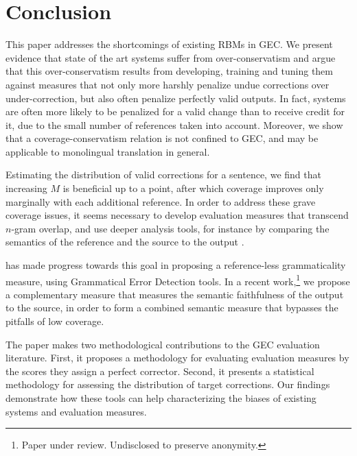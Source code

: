 \documentclass[a4paper, 11pt]{article}
\begin{document}
	\vspace{-0.1cm}
\section{Conclusion}\label{sec:conclusion}
	\vspace{-0.1cm}

This paper addresses the shortcomings of existing RBMs in GEC.
We present evidence that state of the art systems suffer from over-conservatism and
argue that this over-conservatism results from developing, training and tuning them against measures that
not only more harshly penalize undue corrections over under-correction,
but also often penalize perfectly valid outputs.
In fact, systems are often more likely to be penalized for a valid change than 
to receive credit for it, due to the small number of references taken into account.
Moreover, we show that a coverage-conservatism relation is not confined to
GEC, and may be applicable to monolingual translation in general.

Estimating the distribution of valid corrections for a sentence, we find
that increasing $M$ is beneficial up to a point, after which
coverage improves only marginally with each additional reference.
In order to address these grave coverage issues, it seems necessary to
develop evaluation measures that transcend $n$-gram overlap, and
use deeper analysis tools, for instance by comparing
the semantics of the reference and the source to the output \cite[cf.][]{lo2011meant}.

has made progress towards this goal in proposing a reference-less grammaticality measure,
using Grammatical Error Detection tools.
In a recent work,\footnote{Paper under review. Undisclosed to preserve anonymity.} we propose a complementary measure that measures the semantic faithfulness of the output to the source, in order to form a combined semantic measure that bypasses the pitfalls of low coverage.

The paper makes two methodological contributions to the GEC evaluation literature. First,
it proposes a methodology for evaluating evaluation measures by the scores they assign a perfect corrector.
Second, it presents a statistical methodology for assessing the distribution of target corrections. 
Our findings demonstrate how these tools can help characterizing the biases of existing systems and evaluation measures.
\end{document}
